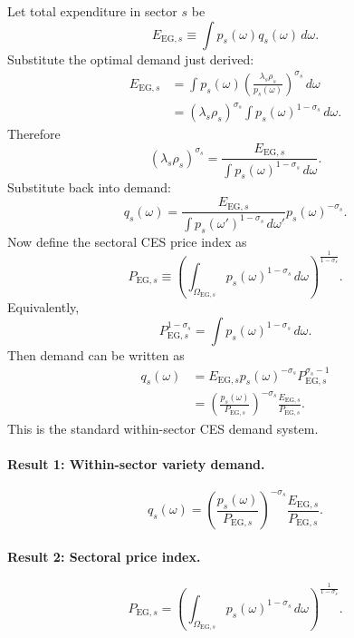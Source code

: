 \documentclass[11pt]{article}
\begin{document}
Let total expenditure in sector \(s\) be
\begin{equation}
E_{\mathrm{EG},s}\equiv \int p_s(\omega)q_s(\omega)\,d\omega.
\end{equation}
Substitute the optimal demand just derived:
\begin{align}
E_{\mathrm{EG},s}
&= \int p_s(\omega)\left(\frac{\lambda_s\rho_s}{p_s(\omega)}\right)^{\sigma_s}\,d\omega \\
&= (\lambda_s\rho_s)^{\sigma_s}\int p_s(\omega)^{1-\sigma_s}\,d\omega.
\end{align}
Therefore
\begin{equation}
(\lambda_s\rho_s)^{\sigma_s} = \frac{E_{\mathrm{EG},s}}{\int p_s(\omega)^{1-\sigma_s}\,d\omega}.
\end{equation}
Substitute back into demand:
\begin{equation}
q_s(\omega) = \frac{E_{\mathrm{EG},s}}{\int p_s(\omega')^{1-\sigma_s}\,d\omega'}p_s(\omega)^{-\sigma_s}.
\end{equation}
Now define the sectoral CES price index as
\begin{equation}
P_{\mathrm{EG},s} \equiv \left(\int_{\Omega_{\mathrm{EG},s}} p_s(\omega)^{1-\sigma_s}\,d\omega\right)^{\frac{1}{1-\sigma_s}}.
\end{equation}
Equivalently,
\begin{equation}
P_{\mathrm{EG},s}^{1-\sigma_s} = \int p_s(\omega)^{1-\sigma_s}\,d\omega.
\end{equation}
Then demand can be written as
\begin{align}
q_s(\omega)
&= E_{\mathrm{EG},s}p_s(\omega)^{-\sigma_s}P_{\mathrm{EG},s}^{\sigma_s-1} \\
&= \left(\frac{p_s(\omega)}{P_{\mathrm{EG},s}}\right)^{-\sigma_s}\frac{E_{\mathrm{EG},s}}{P_{\mathrm{EG},s}}.
\end{align}
This is the standard within-sector CES demand system.

\paragraph{Result 1: Within-sector variety demand.}
\begin{equation}
q_s(\omega)=\left(\frac{p_s(\omega)}{P_{\mathrm{EG},s}}\right)^{-\sigma_s}\frac{E_{\mathrm{EG},s}}{P_{\mathrm{EG},s}}.
\label{eq:varietydemand_final}
\end{equation}

\paragraph{Result 2: Sectoral price index.}
\begin{equation}
P_{\mathrm{EG},s}=\left(\int_{\Omega_{\mathrm{EG},s}} p_s(\omega)^{1-\sigma_s}\,d\omega\right)^{\frac{1}{1-\sigma_s}}.
\label{eq:sectorprice_final}
\end{equation}
\end{document}

